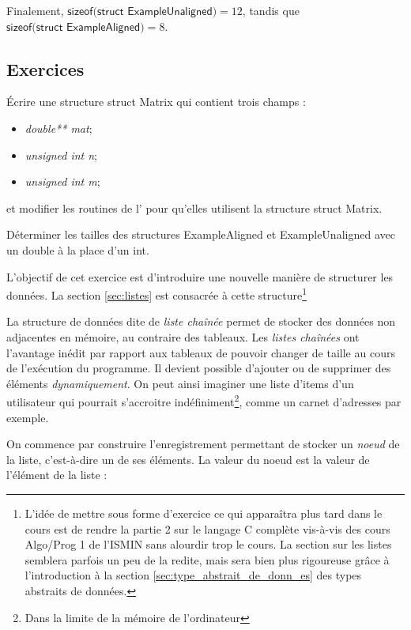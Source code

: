 \documentclass[../../../main.tex]{subfiles}
\begin{document}
Finalement, $\textsf{sizeof(struct ExampleUnaligned)} = 12$, tandis que $\textsf{sizeof(struct ExampleAligned)} = 8$.
\subsection{Exercices}
 Écrire une structure \textsf{struct Matrix} qui contient trois champs :
\begin{itemize}
	\item \textit{double** mat};
	\item \textit{unsigned int n};
	\item \textit{unsigned int m};
\end{itemize}
et modifier les routines de l' pour qu'elles utilisent la structure \textsf{struct Matrix}.

 Déterminer les tailles des structures \textsf{ExampleAligned} et \textsf{ExampleUnaligned} avec un \textsf{double} à la place d'un \textsf{int}.

L'objectif de cet exercice est d'introduire une nouvelle manière de structurer les données. La section \ref{sec:listes} est consacrée à cette structure\footnote{L'idée de mettre sous forme d'exercice ce qui apparaîtra plus tard dans le cours est de rendre la partie 2 sur le langage C complète vis-à-vis des cours Algo/Prog 1 de l'ISMIN sans  alourdir trop le cours. La section sur les listes semblera parfois un peu de la redite, mais sera bien plus rigoureuse grâce à l'introduction à la section \ref{sec:type_abstrait_de_donn_es} des types abstraits de données.}

La structure de données dite de \textit{liste chaînée} permet de stocker des données non adjacentes en mémoire, au contraire des tableaux. Les \textit{listes chaînées} ont l'avantage inédit par rapport aux tableaux de pouvoir changer de taille au cours de l'exécution du programme. Il devient possible d'ajouter ou de supprimer des éléments \textit{dynamiquement}. On peut ainsi imaginer une liste d'items d'un utilisateur qui pourrait s'accroitre indéfiniment\footnote{Dans la limite de la mémoire de l'ordinateur}, comme un carnet d'adresses par exemple.
 
On commence par construire l'enregistrement permettant de stocker un \textit{noeud} de la liste, c'est-à-dire un de ses éléments. La valeur du noeud est la valeur de l'élément de la liste :
 
\begin{minipage}{\textwidth}
	\begin{center}
		
		\label{img:node}
	\end{center}
\end{minipage}
\end{document}
